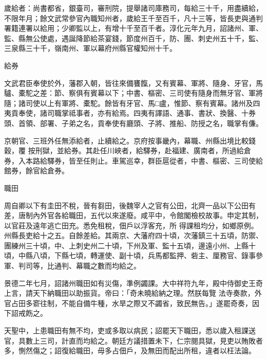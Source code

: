 \begin{pinyinscope}
 歲給者：尚書都省，銀臺司，審刑院，提舉諸司庫務司，每給三十千，用盡續給，不限年月；餘文武常參官內職知州者，歲給王千至百千，凡十三等，皆長吏與通判署籍連署以給用；少卿監以上，有增十千至百千者。淳化元年九月，詔諸州、軍、監、縣無公使處，遇誕降節給茶宴錢，節度州百千，防、團、刺史州五十千，監、三泉縣三十千，嶺南州、軍以幕府州縣官權知州十千。



 給券



 文武君臣奉使於外，藩郡入朝，皆往來備饔餼，又有賓幕、軍將、隨身、牙官，馬驢、橐駝之差：節、察俱有賓幕以下；中書、樞密、三司使有隨身而無牙官、軍將隨；諸司使以上有軍將、橐駝。餘皆有牙官、馬□盧，惟節、察有賓幕。諸州及四夷貢奉使，諸司職掌祗事者，亦有給焉。四夷有譯語、通事、書狀、換醫、十券頭、首領、部署、子弟之名，貢奉使有廳頭、子將、推船、防授之名，職掌有傔。



 京朝官、三班外任無添給者，止續給之。京府按事畿內，幕職、州縣出境比較錢穀，覆
 按刑獄，並給券。其赴任川峽者，給驛券，赴福建、廣南者，所過給倉券，入本路給驛券，皆至任則止。車駕巡幸，群臣扈從者，中書、樞密、三司使給館券，餘官給倉券。



 職田



 周自卿以下有圭田不稅，晉有芻田，後魏宰人之官有公田，北齊一品以下公田有差，唐制內外官各給職田，五代以來遂廢。咸平中，令館閣檢校故事。申定其制，以官莊及遠年逃亡田充。悉免租稅，佃戶以浮客充，所
 得課租均分，如鄉原例。州縣長吏給十之五。自餘差給。其兩京、大藩府四十頃，次藩鎮三十五頃，防禦、團練州三十頃，中、上刺史州二十頃，下州及軍、監十五頃，邊遠小州、上縣十頃，中縣八頃，下縣七頃，轉運使、副十頃，兵馬都監押、砦主、厘務官、錄事參軍、判司等，比通判、幕職之數而均給之。



 景德二年七月，詔諸州職田如有災傷，準例蠲課。大中祥符九年，殿中侍御史王奇上言，請天下納職田以助振貨。帝曰：「奇未曉給納之理。然朕每覽
 法寺奏款，外官占田多窬往制，不能自備牛種，水旱之際又不蠲省，致民無告。」遂罷奇奏，因下詔戒飭之。



 天聖中，上患職田有無不均，吏或多取以病民；詔罷天下職田，悉以歲入租課送官，具數上三司，計直而均給之。朝廷方議措置未下，仁宗閱具獄，見吏以賄敗者多，惻然傷之；詔復給職田，毋多占佃戶，及無田而配出所租，違者以枉法論。




\end{pinyinscope}
